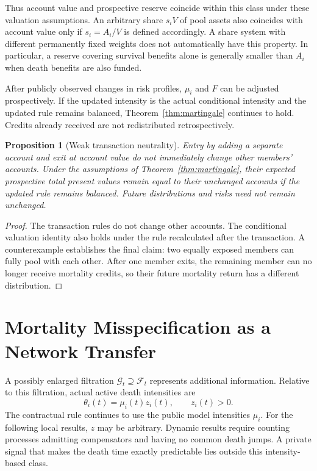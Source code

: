 \documentclass[11pt,a4paper]{article}
\newtheorem{proposition}[theorem]{Proposition}
\theoremstyle{definition}\newtheorem{definition}[theorem]{Definition}
\theoremstyle{remark}\newtheorem{remark}[theorem]{Remark}
\newcommand{\calF}{\mathcal F}
\newcommand{\calG}{\mathcal G}
\begin{document}
Thus account value and prospective reserve coincide within this class under these valuation assumptions. An arbitrary share $s_iV$ of pool assets also coincides with account value only if $s_i=A_i/V$ is defined accordingly. A share system with different permanently fixed weights does not automatically have this property. In particular, a reserve covering survival benefits alone is generally smaller than $A_i$ when death benefits are also funded.

After publicly observed changes in risk profiles, $\mu_i$ and $F$ can be adjusted prospectively. If the updated intensity is the actual conditional intensity and the updated rule remains balanced, Theorem~\ref{thm:martingale} continues to hold. Credits already received are not redistributed retrospectively.

\begin{proposition}[Weak transaction neutrality]\label{prop:neutral}
Entry by adding a separate account and exit at account value do not immediately change other members' accounts. Under the assumptions of Theorem~\ref{thm:martingale}, their expected prospective total present values remain equal to their unchanged accounts if the updated rule remains balanced. Future distributions and risks need not remain unchanged.
\end{proposition}
\begin{proof}
The transaction rules do not change other accounts. The conditional valuation identity also holds under the rule recalculated after the transaction. A counterexample establishes the final claim: two equally exposed members can fully pool with each other. After one member exits, the remaining member can no longer receive mortality credits, so their future mortality return has a different distribution.
\end{proof}

\section{Mortality Misspecification as a Network Transfer}
A possibly enlarged filtration $\calG_t\supseteq\calF_t$ represents additional information. Relative to this filtration, actual active death intensities are
\[
\theta_i(t)=\mu_i(t)z_i(t),\qquad z_i(t)>0.
\]
The contractual rule continues to use the public model intensities $\mu_i$. For the following local results, $z$ may be arbitrary. Dynamic results require counting processes admitting compensators and having no common death jumps. A private signal that makes the death time exactly predictable lies outside this intensity-based class.
\end{document}
